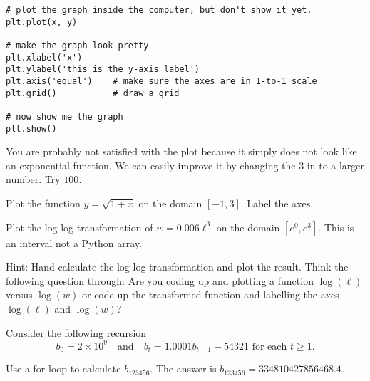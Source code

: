 \documentclass[../main.tex]{subfiles}
\begin{document}
\begin{enumerate}
\begin{verbatim}
# plot the graph inside the computer, but don't show it yet.
plt.plot(x, y)

# make the graph look pretty
plt.xlabel('x')
plt.ylabel('this is the y-axis label')
plt.axis('equal')    # make sure the axes are in 1-to-1 scale
plt.grid()           # draw a grid

# now show me the graph
plt.show()
    \end{verbatim}

    You are probably not satisfied with the plot because it simply does not look like an exponential function.  We can easily improve it by changing the \(3\) in  to a larger number. Try \(100\). 

\end{enumerate}

\begin{example}
  Plot the function \(y = \sqrt{1 + x}\) on the domain \([-1,3]\). Label the axes.
\end{example}

\begin{example}
  Plot the log-log transformation of \(w = 0.006 \ell^{3}\) on the domain \([e^{0}, e^{3}]\). This is an interval not a Python array.

  Hint: Hand calculate the log-log transformation and plot the result.  Think the following question through: Are you coding up and plotting a function \(\log(\ell)\) versus \(\log(w)\) or code up the transformed function and labelling the axes \(\log(\ell)\) and \(\log(w)\)?

\end{example}


\begin{example}
  Consider the following recursion
  \[
    b_{0} = 2 \times 10^{9} \quad\text{and}\quad b_{t} = 1.0001 b_{t-1} - 54321 \text{ for each } t \ge 1.
  \]

  Use a for-loop to calculate \(b_{123456}\).  The answer is \(b_{123456} = 334810427856468.4\).
\end{example}
\clearpage
\end{document}

